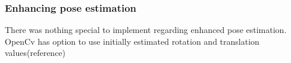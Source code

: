 \subsubsection{Enhancing pose estimation}
There was nothing special to implement regarding enhanced pose estimation. OpenCv has option to use initially estimated rotation and translation values(reference)%



